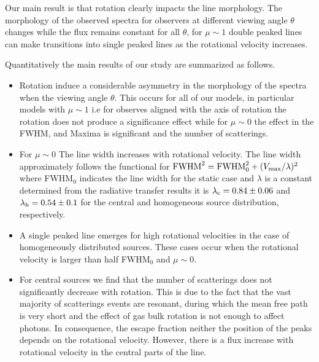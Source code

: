 \documentclass{emulateapj}
\newcommand{\ly}{{\ifmmode{{\rm Ly}\alpha~}\else{Ly$\alpha$~}\fi}}
\begin{document}
Our main result is that rotation clearly impacts the \ly line
morphology. The morphology of the observed spectra for observers at different
viewing angle $\theta$ changes while the flux remains constant for all $\theta$,
for $\mu \sim 1$ double peaked lines can make transitions into single
peaked lines as the rotational velocity increases. 

Quantitatively the main results of our study are summarized as follows.

\begin{itemize}

\item Rotation induce a considerable asymmetry in the morphology 
 of the spectra when the viewing angle $\theta$. This occurs for
 all of our models, in particular models with $\mu\sim 1$ i.e for 
 observes aligned with the axis of rotation the rotation does not 
 produce a significance effect while for $\mu\sim 0$ the effect in 
 the FWHM, and Maxima is significant and the number of scatterings.


\item For $\mu \sim 0$ The line width increases with rotational velocity. The line width
  approximately follows the functional for  ${\rm FWHM}^2 = {\rm FWHM}_{
    0}^2 + (V_{\rm max}/\lambda)^2$ where FWHM$_{0}$ indicates the line
  width for the static case and $\lambda$ is a constant determined from
  the radiative transfer results it is $\lambda_{\rm c}=0.84 \pm 0.06$ and
  $\lambda_{\rm h}=0.54\pm 0.1$ for the central and homogeneous source
  distribution, respectively.

\item A single peaked line emerges for high rotational velocities in
  the case of homogeneously distributed sources. These cases occur when
  the rotational velocity is larger than half FWHM$_0$ and $\mu\sim 0$.  

\item For central sources we find that the number of scatterings
does not significantly decrease with rotation. This is due to the 
fact that the vast majority of scatterings events are resonant, 
during which the mean free path is very short and the effect of gas
bulk rotation is not enough to affect \ly photons. In consequence, 
the escape fraction neither the position of the peaks depends on the
rotational velocity. However, there is a flux increase with rotational
velocity in the central parts of the line.


\end{itemize}
\end{document}
